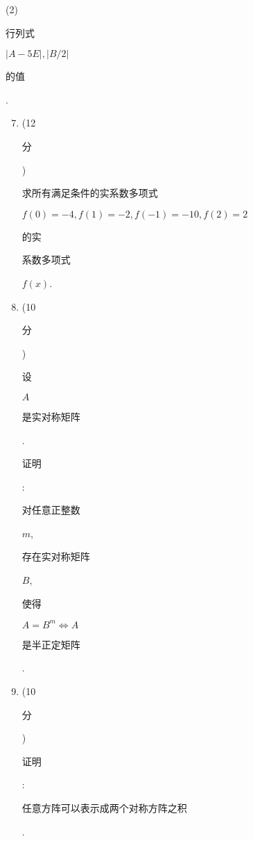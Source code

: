 \documentclass[10pt]{article}
\begin{document}
(2) \begin{CJK}{UTF8}{mj}行列式\end{CJK} $|A-5 E|,|B / 2|$ \begin{CJK}{UTF8}{mj}的值\end{CJK}.

\begin{enumerate}
  \setcounter{enumi}{6}
  \item (12 \begin{CJK}{UTF8}{mj}分\end{CJK}) \begin{CJK}{UTF8}{mj}求所有满足条件的实系数多项式\end{CJK} $f(0)=-4, f(1)=-2, f(-1)=-10, f(2)=2$ \begin{CJK}{UTF8}{mj}的实\end{CJK} \begin{CJK}{UTF8}{mj}系数多项式\end{CJK} $f(x)$.

  \item (10 \begin{CJK}{UTF8}{mj}分\end{CJK}) \begin{CJK}{UTF8}{mj}设\end{CJK} $A$ \begin{CJK}{UTF8}{mj}是实对称矩阵\end{CJK}. \begin{CJK}{UTF8}{mj}证明\end{CJK}: \begin{CJK}{UTF8}{mj}对任意正整数\end{CJK} $m$, \begin{CJK}{UTF8}{mj}存在实对称矩阵\end{CJK} $B$, \begin{CJK}{UTF8}{mj}使得\end{CJK} $A=B^{m} \Leftrightarrow A$ \begin{CJK}{UTF8}{mj}是半正定矩阵\end{CJK}.

  \item (10 \begin{CJK}{UTF8}{mj}分\end{CJK}) \begin{CJK}{UTF8}{mj}证明\end{CJK}: \begin{CJK}{UTF8}{mj}任意方阵可以表示成两个对称方阵之积\end{CJK}.


\end{enumerate}
\end{document}

